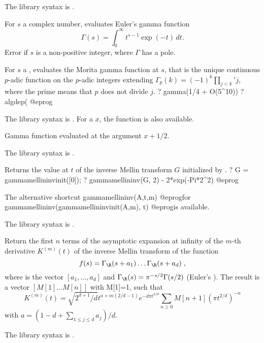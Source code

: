 The library syntax is .

\label{se:gamma}
For $s$ a complex number, evaluates Euler's gamma
function 
$$\Gamma(s)=\int_0^\infty t^{s-1}\exp(-t)\,dt.$$
Error if $s$ is a non-positive integer, where $\Gamma$ has a pole.

For $s$ a , evaluates the Morita gamma function at $s$, that
is the unique continuous $p$-adic function on the $p$-adic integers
extending $\Gamma_p(k)=(-1)^k \prod_{j<k}'j$, where the prime means that $p$
does not divide $j$.
\bprog
? gamma(1/4 + O(5^10))
? algdep(%
@eprog

The library syntax is .
For a  $x$, the function  is
also available.

\label{se:gammah}
Gamma function evaluated at the argument $x+1/2$.

The library syntax is .

\label{se:gammamellininv}
Returns the value at $t$ of the inverse Mellin transform
$G$ initialized by .
\bprog
? G = gammamellininvinit([0]);
? gammamellininv(G, 2) - 2*exp(-Pi*2^2)
@eprog

The alternative shortcut
\bprog
  gammamellininv(A,t,m)
@eprog\noindent for
\bprog
  gammamellininv(gammamellininvinit(A,m), t)
@eprog\noindent is available.

The library syntax is .

\label{se:gammamellininvasymp}
Return the first $n$ terms of the asymptotic expansion at infinity
of the $m$-th derivative $K^{(m)}(t)$ of the inverse Mellin transform of the
function
$$f(s) = \Gamma_\R(s+a_1)\*\ldots\*\Gamma_\R(s+a_d)\;,$$
where  is the vector $[a_1,\ldots,a_d]$ and
$\Gamma_\R(s)=\pi^{-s/2}\*\Gamma(s/2)$ (Euler's ).
The result is a vector
$[M[1]...M[n]]$ with M[1]=1, such that
$$K^{(m)}(t)=\sqrt{2^{d+1}/d}t^{a+m(2/d-1)}e^{-d\pi t^{2/d}}
   \sum_{n\ge0} M[n+1] (\pi t^{2/d})^{-n} $$
with $a=(1-d+\sum_{1\le j\le d}a_j)/d$.

The library syntax is .

